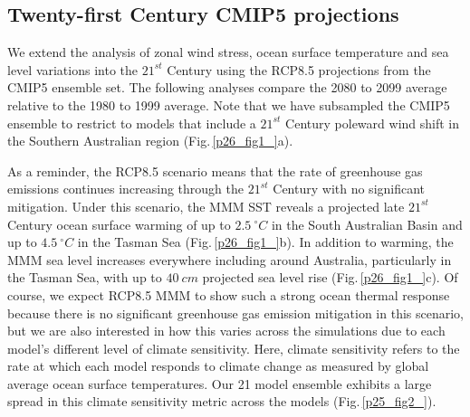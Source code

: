 \documentclass[draft,linenumbers]{agujournal2018}
\begin{document}
\subsection{Twenty-first Century CMIP5 projections}
We extend the analysis of zonal wind stress, ocean surface temperature and sea level variations into the $21^{st}$ Century using the RCP8.5 projections from the CMIP5 ensemble set. The following analyses compare the 2080 to 2099 average relative to the 1980 to 1999 average. Note that we have subsampled the CMIP5 ensemble to restrict to models that include a $21^{st}$ Century poleward wind shift in the Southern Australian region (Fig.\,\ref{p26_fig1_}a).

As a reminder, the RCP8.5 scenario means that the rate of greenhouse gas emissions continues increasing through the $21^{st}$ Century with no significant mitigation. Under this scenario, the MMM SST reveals a projected late $21^{st}$ Century ocean surface warming of up to $2.5\ ^{\circ}C$ in the South Australian Basin and up to $4.5\ ^{\circ}C$ in the Tasman Sea (Fig.\,\ref{p26_fig1_}b). In addition to warming, the MMM sea level increases everywhere including around Australia, particularly in the Tasman Sea, with up to $40\ cm$ projected sea level rise (Fig.\,\ref{p26_fig1_}c). Of course, we expect RCP8.5 MMM to show such a strong ocean thermal response because there is no significant greenhouse gas emission mitigation in this scenario, but we are also interested in how this varies across the simulations due to each model's different level of climate sensitivity. Here, climate sensitivity refers to the rate at which each model responds to climate change as measured by global average ocean surface temperatures. Our 21 model ensemble exhibits a large spread in this climate sensitivity metric across the models (Fig.\,\ref{p25_fig2_}).
\end{document}
